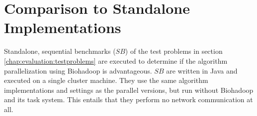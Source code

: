 % 
% 
% 

\section{Comparison to Standalone Implementations}
\label{chap:evaluation:comparison}
Standalone, sequential benchmarks ($SB$) of the test problems in section \ref{chap:evaluation:testproblems} are executed to determine if the algorithm parallelization using Biohadoop is advantageous. $SB$ are written in Java and executed on a single cluster machine. They use the same algorithm implementations and settings as the parallel versions, but run without Biohadoop and its task system. This entails that they perform no network communication at all.

